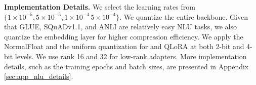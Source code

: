 \noindent \textbf{Implementation Details.}
We select the learning rates from $\{1\times10^{-5},5\times10^{-5} , 1\times10^{-4}\,5\times10^{-4}\}$. We quantize the entire backbone. Given that GLUE,  SQuADv1.1, and ANLI are relatively easy NLU tasks, we also quantize the embedding layer for higher compression efficiency. We apply the NormalFloat and the uniform quantization for {\OurAlg} and QLoRA at both 2-bit and 4-bit levels. We use rank 16 and 32 for low-rank adapters. %
More implementation details, such as the training epochs and batch sizes, are presented in Appendix \ref{sec:app_nlu_details}.

